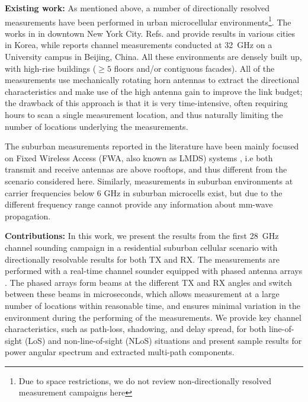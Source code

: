 \documentclass[conference]{IEEEtran}
\begin{document}
{\bf Existing work:} As mentioned above, a number of directionally resolved measurements have been performed in urban microcellular environments\footnote{Due to space restrictions, we do not review non-directionally resolved measurement campaigns here}. The works in \cite{Rappaport_et_al_2015_TCom,maccartney2014omnidirectional,sulyman2014radio} in downtown New York City. Refs. \cite{park2016millimeter} and \cite{Hur_et_al_2015_EuCAP} provide results in various cities in Korea, while  \cite{zhao2017channel} reports channel measurements conducted at \SI{32}{GHz} on a University campus in Beijing, China. All these environments are densely built up, with high-rise buildings ($\ge 5$ floors and/or contiguous facades). All of the measurements use mechanically rotating horn antennas to extract the directional characteristics and make use of the high antenna gain to improve the link budget; the drawback of this approach is that it is very time-intensive, often requiring hours to scan a single measurement location, and thus naturally limiting the number of locations underlying the measurements. 

The suburban measurements reported in the literature have been mainly focused on Fixed Wireless Access (FWA, also known as LMDS) systems \cite{Papazian_1997_study,Eldeen_2010_modelling,Xu_2000_Measurements}, i.e both transmit and receive antennas are above rooftops, and thus different from the scenario considered here. Similarly, measurements in suburban environments at carrier frequencies below 6 GHz in suburban microcells exist, but due to the different frequency range cannot provide any information about mm-wave propagation. 


{\bf Contributions:}
In this work, we present the results from the first \SI{28}{GHz} channel sounding campaign in a residential suburban cellular scenario with directionally resolvable results for both TX and RX. The measurements are performed with a real-time channel sounder equipped with phased antenna arrays \cite{bas_2017_realtime}. The phased arrays form beams at the different TX and RX angles and switch between these beams in microseconds, which allows measurement at a large number of locations within reasonable time, and ensures minimal variation in the environment during the performing of the measurements. We provide key channel characteristics, such as path-loss, shadowing, and delay spread, for both line-of-sight (LoS) and non-line-of-sight (NLoS) situations and present sample results for power angular spectrum and extracted multi-path components.
\end{document}

